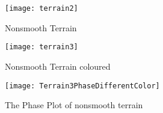 \begin{figure}[!htbp]
  \begin{center}
      \texttt{[image: terrain2]}
    \caption{Nonsmooth Terrain }
    \label{fig:nonsmoothterrain1}
\end{center}
\end{figure}

\begin{figure}[!htbp]
  \begin{center}
      \texttt{[image: terrain3]}
    \caption{Nonsmooth Terrain coloured}
    \label{fig:nonsmootterrain2}
\end{center}
\end{figure}


\begin{figure}[!htbp]
  \begin{center}
    \texttt{[image: Terrain3PhaseDifferentColor]}
    \caption{The Phase Plot of nonsmooth terrain}
    \label{fig:diffterrain2}
\end{center}
\end{figure}






